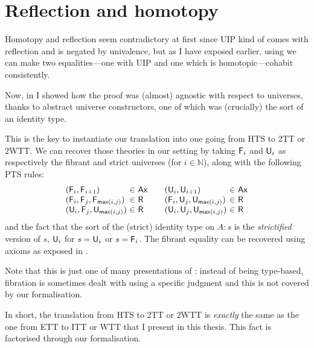 \chapter{Reflection and homotopy}

Homotopy and reflection seem contradictory at first since \acrshort{UIP}
kind of comes with reflection and is negated by univalence, but as I have
exposed earlier, using  we can make two equalities---one with
\acrshort{UIP} and one which is homotopic---cohabit consistently.

Now, in  I showed how the proof was
(almost) agnostic with respect to universes, thanks to abstract universe
constructors, one of which was (crucially) the sort of an identity type.

This is the key to instantiate our translation into one going from
\acrshort{HTS} to \acrshort{2TT} or \acrshort{2WTT}.
We can recover those theories in our setting by taking $\mathsf{F}_{i}$ and $\mathsf{U}_{i}$ as
respectively the fibrant and strict universes
(for $i \in \mathbb{N}$), along with the following \acrshort{PTS} rules:
%
\[
\begin{array}{l@{~}c@{~}l@{\qquad}l@{~}c@{~}l}
  (\F{i}, \F{i+1}) &\in& \Ax &
  (\Un{i}, \Un{i+1}) &\in& \Ax \\
  (\F{i}, \F{j}, \F{\nmax{i}{j}}) &\in& \Rl &
  (\F{i}, \Un{j}, \Un{\nmax{i}{j}}) &\in& \Rl \\
  (\Un{i}, \F{j}, \Un{\nmax{i}{j}}) &\in& \Rl &
  (\Un{i}, \Un{j}, \Un{\nmax{i}{j}}) &\in& \Rl \\
\end{array}
\]
%
and the fact that the sort of the (strict) identity type on $A : s$ is
the \emph{strictified} version of $s$, \ie $\mathsf{U}_{i}$ for $s = \mathsf{U}_{i}$ or
$s = \mathsf{F}_{i}$.
The fibrant equality can be recovered using axioms as exposed in
.

Note that this is just one of many presentations of : instead
of being type-based, fibration is sometimes dealt with using a specific
judgment and this is not covered by our formalisation.

In short, the translation from \acrshort{HTS} to \acrshort{2TT} or
\acrshort{2WTT} is \emph{exactly} the same as the one
from \acrshort{ETT} to \acrshort{ITT} or \acrshort{WTT} that I present in this
thesis. This fact is factorised through our formalisation.